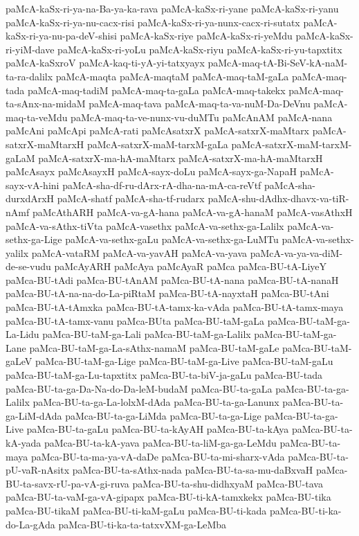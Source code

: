 {paMcA-kaSx-ri-ya-na-Ba-ya-ka-rava
paMcA-kaSx-ri-yane
paMcA-kaSx-ri-yanu
paMcA-kaSx-ri-ya-nu-cacx-risi
paMcA-kaSx-ri-ya-nunx-cacx-ri-sutatx
paMcA-kaSx-ri-ya-nu-pa-deV-shisi
paMcA-kaSx-riye
paMcA-kaSx-ri-yeMdu
paMcA-kaSx-ri-yiM-dave
paMcA-kaSx-ri-yoLu
paMcA-kaSx-riyu
paMcA-kaSx-ri-yu-tapxtitx
paMcA-kaSxroV
paMcA-kaq-ti-yA-yi-tatxyayx
paMcA-maq-tA-Bi-SeV-kA-naM-ta-ra-dalilx
paMcA-maqta
paMcA-maqtaM
paMcA-maq-taM-gaLa
paMcA-maq-tada
paMcA-maq-tadiM
paMcA-maq-ta-gaLa
paMcA-maq-takekx
paMcA-maq-ta-sAnx-na-midaM
paMcA-maq-tava
paMcA-maq-ta-va-nuM-Da-DeVnu
paMcA-maq-ta-veMdu
paMcA-maq-ta-ve-nunx-vu-duMTu
paMcAnAM
paMcA-nana
paMcAni
paMcApi
paMcA-rati
paMcAsatxrX
paMcA-satxrX-maMtarx
paMcA-satxrX-maMtarxH
paMcA-satxrX-maM-tarxM-gaLa
paMcA-satxrX-maM-tarxM-gaLaM
paMcA-satxrX-ma-hA-maMtarx
paMcA-satxrX-ma-hA-maMtarxH
paMcAsayx
paMcAsayxH
paMcA-sayx-doLu
paMcA-sayx-ga-NapaH
paMcA-sayx-vA-hini
paMcA-sha-df-ru-dArx-rA-dha-na-mA-ca-reVtf
paMcA-sha-durxdArxH
paMcA-shatf
paMcA-sha-tf-rudarx
paMcA-shu-dAdhx-dhavx-va-tiR-nAmf
paMcAthARH
paMcA-va-gA-hana
paMcA-va-gA-hanaM
paMcA-vasAthxH
paMcA-va-sAthx-tiVta
paMcA-vasethx
paMcA-va-sethx-ga-Lalilx
paMcA-va-sethx-ga-Lige
paMcA-va-sethx-gaLu
paMcA-va-sethx-ga-LuMTu
paMcA-va-sethx-yalilx
paMcA-vataRM
paMcA-va-yavAH
paMcA-va-yava
paMcA-va-ya-va-diM-de-se-vudu
paMcAyARH
paMcAya
paMcAyaR
paMca
paMca-BU-tA-LiyeY
paMca-BU-tAdi
paMca-BU-tAnAM
paMca-BU-tA-nana
paMca-BU-tA-nanaH
paMca-BU-tA-na-na-do-La-piRtaM
paMca-BU-tA-nayxtaH
paMca-BU-tAni
paMca-BU-tA-tAmxka
paMca-BU-tA-tamx-ka-vAda
paMca-BU-tA-tamx-maya
paMca-BU-tA-tamx-vanu
paMca-BUta
paMca-BU-taM-gaLa
paMca-BU-taM-ga-La-Lidu
paMca-BU-taM-ga-Lali
paMca-BU-taM-ga-Lalilx
paMca-BU-taM-ga-Lane
paMca-BU-taM-ga-La-sAthx-namaM
paMca-BU-taM-gaLe
paMca-BU-taM-gaLeV
paMca-BU-taM-ga-Lige
paMca-BU-taM-ga-Live
paMca-BU-taM-gaLu
paMca-BU-taM-ga-Lu-tapxtitx
paMca-BU-ta-biV-ja-gaLu
paMca-BU-tada
paMca-BU-ta-ga-Da-Na-do-Da-leM-budaM
paMca-BU-ta-gaLa
paMca-BU-ta-ga-Lalilx
paMca-BU-ta-ga-La-lolxM-dAda
paMca-BU-ta-ga-Lanunx
paMca-BU-ta-ga-LiM-dAda
paMca-BU-ta-ga-LiMda
paMca-BU-ta-ga-Lige
paMca-BU-ta-ga-Live
paMca-BU-ta-gaLu
paMca-BU-ta-kAyAH
paMca-BU-ta-kAya
paMca-BU-ta-kA-yada
paMca-BU-ta-kA-yava
paMca-BU-ta-liM-ga-ga-LeMdu
paMca-BU-ta-maya
paMca-BU-ta-ma-ya-vA-daDe
paMca-BU-ta-mi-sharx-vAda
paMca-BU-ta-pU-vaR-nAsitx
paMca-BU-ta-sAthx-nada
paMca-BU-ta-sa-mu-daBxvaH
paMca-BU-ta-savx-rU-pa-vA-gi-ruva
paMca-BU-ta-shu-didhxyaM
paMca-BU-tava
paMca-BU-ta-vaM-ga-vA-gipapx
paMca-BU-ti-kA-tamxkekx
paMca-BU-tika
paMca-BU-tikaM
paMca-BU-ti-kaM-gaLu
paMca-BU-ti-kada
paMca-BU-ti-ka-do-La-gAda
paMca-BU-ti-ka-ta-tatxvXM-ga-LeMba
}

